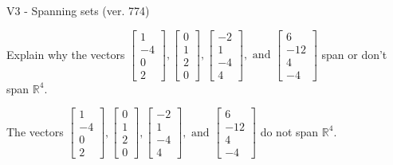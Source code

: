 \begin{exercise}
  \begin{exerciseTitle}V3 - Spanning sets (ver. 774)\end{exerciseTitle}
  \begin{exerciseStatement}
    Explain why the vectors \(\left[\begin{array}{r}
1 \\
-4 \\
0 \\
2
\end{array}\right] , \left[\begin{array}{r}
0 \\
1 \\
2 \\
0
\end{array}\right] , \left[\begin{array}{r}
-2 \\
1 \\
-4 \\
4
\end{array}\right] , \text{ and } \left[\begin{array}{r}
6 \\
-12 \\
4 \\
-4
\end{array}\right]\) span or don't span \(\mathbb{R}^4\). 
	


  \end{exerciseStatement}
  \begin{exerciseAnswer}
   The vectors \(\left[\begin{array}{r}
1 \\
-4 \\
0 \\
2
\end{array}\right] , \left[\begin{array}{r}
0 \\
1 \\
2 \\
0
\end{array}\right] , \left[\begin{array}{r}
-2 \\
1 \\
-4 \\
4
\end{array}\right] , \text{ and } \left[\begin{array}{r}
6 \\
-12 \\
4 \\
-4
\end{array}\right]\) 
  	 do not  
	span \(\mathbb{R}^4\).
  


  \end{exerciseAnswer}
\end{exercise}